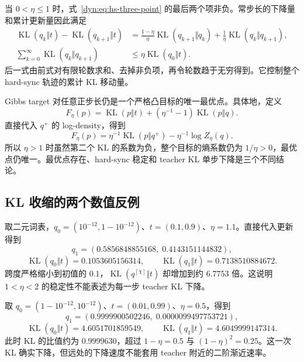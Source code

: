\documentclass[lang=cn,scheme=chinese,openany]{../book/elegantbook}
\newcommand{\KL}{\operatorname{KL}}
\begin{document}
当 $0<\eta\leq1$ 时，式~\eqref{dyn:eq:hs-three-point} 的最后两个项非负。常步长的下降量和累计更新量因此满足
\begin{align*}
 \KL(q_k\Vert t)-\KL(q_{k+1}\Vert t)
 &=\frac{1-\eta}{\eta}\KL(q_{k+1}\Vert q_k)
 +\frac1\eta\KL(q_k\Vert q_{k+1}),\\
 \sum_{k=0}^{\infty}\KL(q_k\Vert q_{k+1})
 &\leq\eta\KL(q_0\Vert t).
\end{align*}
后一式由前式对有限轮数求和、去掉非负项，再令轮数趋于无穷得到。它控制整个 hard-sync 轨迹的累计 KL 移动量。

Gibbs target 对任意正步长仍是一个严格凸目标的唯一最优点。具体地，定义
\begin{equation*}
 F_\eta(p)=\KL(p\Vert t)
 +(\eta^{-1}-1)\KL(p\Vert q).
\end{equation*}
直接代入 $q^+$ 的 log-density，得到
\begin{equation*}
 F_\eta(p)=\eta^{-1}\KL(p\Vert q^+)
 -\eta^{-1}\log Z_\eta(q).
\end{equation*}
所以 $\eta>1$ 时虽然第二个 KL 的系数为负，整个目标的熵系数仍为 $1/\eta>0$，最优点仍唯一。最优点存在、hard-sync 稳定和 teacher KL 单步下降是三个不同结论。

\subsection{KL 收缩的两个数值反例}

取二元词表，$q_0=(10^{-12},1-10^{-12})$、$t=(0.1,0.9)$、$\eta=1.1$。直接代入更新得到
\begin{equation*}
 q_1=(0.5856848855168,\;0.4143151144832),
\end{equation*}
\begin{equation*}
 \KL(q_0\Vert t)=0.1053605156314,
 \qquad\KL(q_1\Vert t)=0.7138510884672.
\end{equation*}
跨度严格缩小到初值的 $0.1$，$\KL(q^{[\chi]}\Vert t)$ 却增加到约 $6.7753$ 倍。这说明 $1<\eta<2$ 的稳定性不能表述为每一步 teacher KL 下降。

取 $q_0=(1-10^{-12},10^{-12})$、$t=(0.01,0.99)$、$\eta=0.5$，得到
\begin{equation*}
 q_1=(0.9999900502246,\;0.0000099497753721),
\end{equation*}
\begin{equation*}
 \KL(q_0\Vert t)=4.6051701859549,
 \qquad\KL(q_1\Vert t)=4.6049999147314.
\end{equation*}
此时 KL 的比值约为 $0.9999630$，超过 $1-\eta=0.5$ 与 $(1-\eta)^2=0.25$。这一次 KL 确实下降，但远处的下降速度不能套用 teacher 附近的二阶渐近速率。
\end{document}
